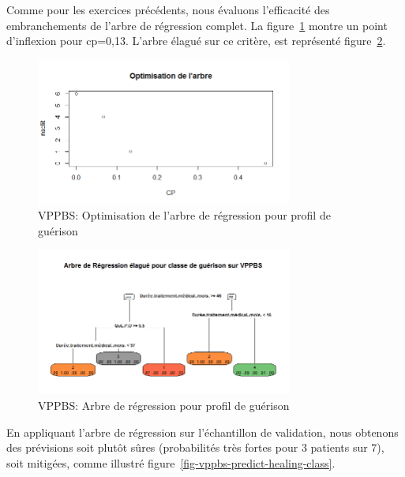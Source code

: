 %
%

%

Comme pour les exercices précédents, nous évaluons l'efficacité des embranchements de l'arbre de régression complet. La figure~\ref{fig-vppbs-regtree-optim-healing-class} montre un point d'inflexion pour cp=0,13. L'arbre élagué sur ce critère, est représenté figure~\ref{fig-vppbs-regtree-healing-class}.

\begin{figure}[H]
\centering
\includegraphics[width=0.75\textwidth]{../Fig/VPPBS/vppbs-regtree-optim-healing-class.png}
\caption{VPPBS: Optimisation de l'arbre de régression pour profil de guérison}
\label{fig-vppbs-regtree-optim-healing-class}
\end{figure}

\begin{figure}[H]
\centering
\includegraphics[width=0.75\textwidth]{../Fig/VPPBS/vppbs-regtree-healing-class.png}
\caption{VPPBS: Arbre de régression pour profil de guérison}
\label{fig-vppbs-regtree-healing-class}
\end{figure}

En appliquant l'arbre de régression sur l'échantillon de validation, nous obtenons des prévisions soit plutôt sûres (probabilités très fortes pour 3 patients sur 7), soit mitigées, comme illustré figure~\ref{fig-vppbs-predict-healing-class}.

